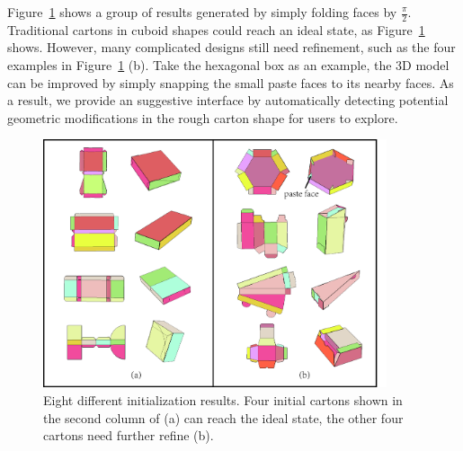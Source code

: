 Figure~\ref{fig:initial} shows a group of results generated by simply folding faces by $\frac{\pi}{2}$.
Traditional cartons in cuboid shapes could reach an ideal state, as Figure~\ref{fig:initial} shows.
However, many complicated designs still need refinement, such as the four examples in Figure~\ref{fig:initial} (b). 
Take the hexagonal box as an example, the 3D model can be improved by simply snapping the small paste faces to its nearby faces. %
%
As a result, we provide an suggestive interface by automatically detecting potential geometric modifications in the rough carton shape for users to explore.

\begin{figure}
	\centering
	\includegraphics[width=0.9\textwidth]{images/initial.jpg}
	\caption{Eight different initialization results. Four initial cartons shown in the second column of (a) can reach the ideal state, the other four cartons need further refine (b).}
	\label{fig:initial}
\end{figure}

